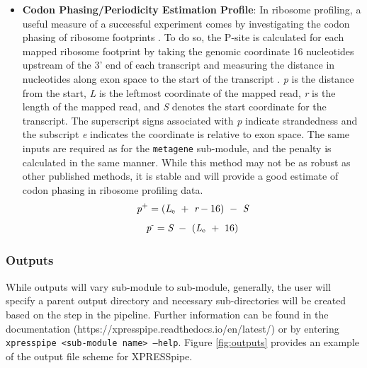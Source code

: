 \documentclass[11pt, a4paper, oneside]{article}
\begin{document}
\begin{enumerate}
\begin{itemize}
      \item \textbf{Codon Phasing/Periodicity Estimation Profile}: In ribosome profiling, a useful measure of a successful experiment comes by investigating the codon phasing of ribosome footprints \cite{ingolia_meth}. To do so, the P-site is calculated for each mapped ribosome footprint by taking the genomic coordinate 16 nucleotides upstream of the 3' end of each transcript and measuring the distance in nucleotides along exon space to the start of the transcript \cite{ribowaltz}. \textit{p} is the distance from the start, \textit{L} is the leftmost coordinate of the mapped read, \textit{r} is the length of the mapped read, and \textit{S} denotes the start coordinate for the transcript. The superscript signs associated with \textit{p} indicate strandedness and the subscript \textit{e} indicates the coordinate is relative to exon space. The same inputs are required as for the \texttt{metagene} sub-module, and the penalty is calculated in the same manner. While this method may not be as robust as other published methods, it is stable and will provide a good estimate of codon phasing in ribosome profiling data.
      \begin{equation}
        \textit{p}\textsuperscript{+} = (\textit{L}\textsubscript{e}\ +\ \textit{r} - 16)\ -\ \textit{S}
      \end{equation}
      \begin{equation}
        \textit{p}\textsuperscript{-} = \textit{S}\ -\ (\textit{L}\textsubscript{e}\ +\ 16)
      \end{equation}

    \end{itemize}
\end{enumerate}


\subsubsection{Outputs}
While outputs will vary sub-module to sub-module, generally, the user will specify a parent output directory and necessary sub-directories will be created based on the step in the pipeline. Further information can be found in the documentation (https://xpresspipe.readthedocs.io/en/latest/) or by entering \texttt{xpresspipe \textless sub-module name\textgreater \ --help}. Figure \ref{fig:outputs} provides an example of the output file scheme for XPRESSpipe.
\end{document}
